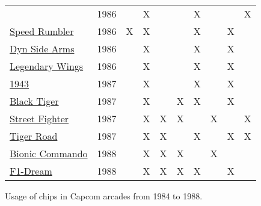 \begin{figure}[H]
{\begin{tabularx}{\textwidth}{Xccccccccc}
                & 1986          &               &      X       &              &              &       X       &               &               &       X       \\
\href{https://www.youtube.com/watch?v=57lg9pFUgco}{Speed Rumbler}
                & 1986          &       X       &      X       &              &              &       X       &               &       X       &               \\
\href{https://www.youtube.com/watch?v=0QyLx94PMio}{Dyn Side Arms}
                & 1986          &               &      X       &              &              &       X       &               &       X       &               \\
\href{https://www.youtube.com/watch?v=0f4jWQyf-fs}{Legendary Wings}
                & 1986          &               &      X       &              &              &       X       &               &       X       &               \\
  \toprule    
\href{https://www.youtube.com/watch?v=kntCwchJWfw}{1943}
                & 1987          &               &      X       &              &              &       X       &               &       X       &               \\
\href{https://www.youtube.com/watch?v=ZzKStmMAiHM}{Black Tiger}
                & 1987          &               &      X       &              &      X       &       X       &               &       X       &               \\
\href{https://www.youtube.com/watch?v=kVLCv-YgWco}{Street Fighter}
                & 1987          &               &      X       &      X       &      X       &               &       X       &               &       X       \\
\href{https://www.youtube.com/watch?v=1ZtwOGN-ZeE}{Tiger Road}
                & 1987          &               &      X       &      X       &              &       X       &               &       X       &       X       \\
  \toprule    
\href{https://www.youtube.com/watch?v=zG620nr7vko}{Bionic Commando}
                & 1988          &               &      X       &      X       &      X       &               &       X       &               &               \\
\href{https://www.youtube.com/watch?v=zG620nr7vko}{F1-Dream}
                & 1988          &               &      X       &      X       &      X       &       X       &               &       X       &               \\
  \toprule    
\end{tabularx}%
}\caption*{Usage of chips in Capcom arcades from 1984 to 1988\cite{cps0chipslist}.}
\label{fig:capcom_pcbs}
\end{figure}



